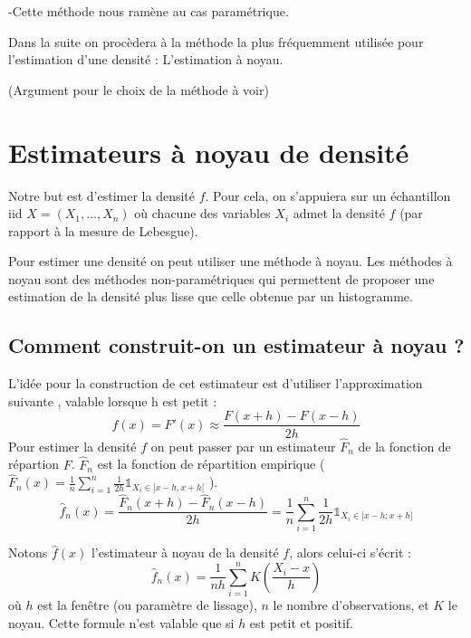 \documentclass[
]{book}
\theoremstyle{definition}
\theoremstyle{definition}
\theoremstyle{definition}
\theoremstyle{definition}
\theoremstyle{remark}
\begin{document}
\begin{rem}
-Cette méthode nous ramène au cas paramétrique.\newline
\end{rem}

Dans la suite on procèdera à la méthode la plus fréquemment utilisée pour l'estimation d'une densité : L'estimation à noyau.\newline 

(Argument pour le choix de la méthode à voir)

\hypertarget{estimateurs-uxe0-noyau-de-densituxe9}{%
\section{Estimateurs à noyau de densité}\label{estimateurs-uxe0-noyau-de-densituxe9}}

Notre but est d'estimer la densité \(f\). Pour cela, on s'appuiera sur un échantillon iid \(X= (X_1,...,X_n)\) où chacune des variables \(X_i\) admet la densité \(f\) (par rapport à la mesure de Lebesgue).

Pour estimer une densité on peut utiliser une méthode à noyau.
Les méthodes à noyau sont des méthodes non-paramétriques qui permettent de proposer une estimation de la densité plus lisse que celle obtenue par un histogramme.

\hypertarget{comment-construit-on-un-estimateur-uxe0-noyau}{%
\subsection{Comment construit-on un estimateur à noyau ?}\label{comment-construit-on-un-estimateur-uxe0-noyau}}

L'idée pour la construction de cet estimateur est d'utiliser l'approximation suivante , valable lorsque h est petit :\\
\[
f(x) = F'(x)\approx \frac{F(x+h)-F(x-h)}{2h}
\]
Pour estimer la densité \(f\) on peut passer par un estimateur \(\hat F_n\) de la fonction de répartion \(F\). \(\hat F_n\) est la fonction de répartition empirique ( \(\hat F_n(x)= \frac1n \sum\limits_{i=1}^n\frac{1}{2h} \mathds1_{X_i \in ]x-h, x+h[}\) ).
\[
\hat f_n(x)= \frac{\hat F_n(x+h)-\hat F_n(x-h)}{2h} = \frac 1n \sum\limits_{i=1}^n \frac1{2h} \mathds1_{X_i \in ]x-h;x+h]}
\]

Notons \(\hat f(x)\) l'estimateur à noyau de la densité \(f\), alors celui-ci s'écrit :
\[
\hat f_n(x) = \frac1{nh} \sum\limits_{i=1}^n K\left(\frac{X_i-x}h\right)
\]
où \(h\) est la fenêtre (ou paramètre de lissage), \(n\) le nombre d'observations, et \(K\) le noyau.
Cette formule n'est valable que si \(h\) est petit et positif.
\end{document}
